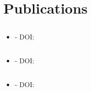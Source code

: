 \documentclass[11pt,a4paper]{article}
\begin{document}
\subsection{\positionTitleEight}
\textit{\positionLocationEight} \hfill \textit{\positionPeriodEight}
\begin{itemize}
    \positionExperienceEight
\end{itemize}
\positionSkillsEight

\subsection{\positionTitleNine}
\textit{\positionLocationNine} \hfill \textit{\positionPeriodNine}
\begin{itemize}
    \positionExperienceNine
\end{itemize}
\positionSkillsNine

\section{Publications}

\subsection{\publicationTitle}
\textit{\publicationAuthors} \hfill \textit{\publicationYear}
\begin{itemize}
    \item \textit{\publicationType} - DOI: \href{https://doi.org/\publicationDOI}{\publicationDOI}
\end{itemize}

\subsection{\publicationTitleTwo}
\textit{\publicationAuthorsTwo} \hfill \textit{\publicationYearTwo}
\begin{itemize}
    \item \textit{\publicationTypeTwo} - DOI: \href{https://doi.org/\publicationDOITwo}{\publicationDOITwo}
\end{itemize}

\subsection{\publicationTitleThree}
\textit{\publicationAuthorsThree} \hfill \textit{\publicationYearThree}
\begin{itemize}
    \item \textit{\publicationTypeThree} - DOI: \href{https://doi.org/\publicationDOIThree}{\publicationDOIThree}
\end{itemize}
\end{document}
